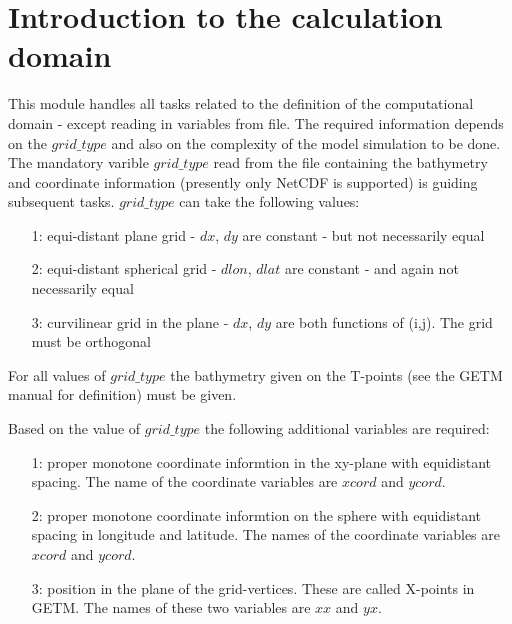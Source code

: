 \section{Introduction to the calculation domain}

\vspace{0.5cm}

  This module handles all tasks related to the definition of the
  computational domain - except reading in variables from file.
  The required information depends on the $grid\_type$ and also on the
  complexity of the model simulation to be done.\newline
  The mandatory varible $grid\_type$ read from the file containing
  the bathymetry and coordinate information (presently only NetCDF
  is supported) is guiding subsequent tasks. $grid\_type$ can take
  the following values:
  \begin{itemize}
      \item[1:] equi-distant plane grid - $dx$, $dy$ are constant - but
                not necessarily equal
      \item[2:] equi-distant spherical grid  - $dlon$, $dlat$ are
                constant - and again not necessarily  equal
      \item[3:] curvilinear grid in the plane - $dx$, $dy$ are both
                functions of (i,j). The grid must be orthogonal
  \end{itemize}

  For all values of $grid\_type$ the bathymetry given on the T-points
  (see the GETM manual for definition) must be given.\newline

  Based on the value of $grid\_type$ the following additional variables
  are required:
  \begin{itemize}
      \item[1:] proper monotone coordinate informtion in the xy-plane
                with equidistant spacing. The name of the coordinate
                variables are $xcord$ and $ycord$.
      \item[2:] proper monotone coordinate informtion on the sphere
                with equidistant spacing in longitude and latitude. The
                names of the coordinate variables are $xcord$ and $ycord$.
      \item[3:] position in the plane of the grid-vertices. These are
                called X-points in GETM. The names of these two variables
                are $xx$ and $yx$.
  \end{itemize}

